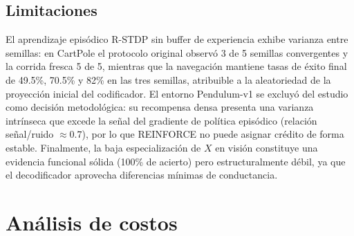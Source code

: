 \subsection{Limitaciones}

El aprendizaje episódico R-STDP sin buffer de experiencia exhibe 
varianza entre semillas: en CartPole el protocolo original observó 3 de 5 
semillas convergentes y la corrida fresca 5 de 5, mientras que la 
navegación mantiene tasas de éxito final de 49.5\%, 70.5\% y 82\% en las 
tres semillas, atribuible a la aleatoriedad de la proyección inicial del 
codificador. El entorno Pendulum-v1 se excluyó del 
estudio como decisión metodológica: su recompensa densa presenta una 
varianza intrínseca que excede la señal del gradiente de política 
episódico (relación señal/ruido $\approx 0.7$), por lo que REINFORCE 
no puede asignar crédito de forma estable. Finalmente, la baja 
especialización de $X$ en visión constituye una evidencia funcional 
sólida (100\% de acierto) pero estructuralmente débil, ya que el 
decodificador aprovecha diferencias mínimas de conductancia.

\section{Análisis de costos}

